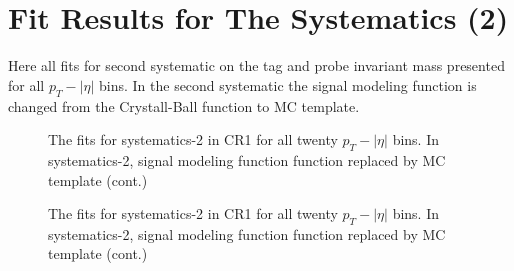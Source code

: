 
\chapter{Fit Results for The Systematics (2)} %

\label{AppendixC} %

Here all fits for second systematic on the tag and probe invariant mass presented for all $p_T-|\eta|$ bins. In the second systematic the signal modeling function is changed from the Crystall-Ball function to MC template.

\begin{figure}[H]
\begin{center}
\scalebox{0.35}{}\scalebox{0.35}{}
\scalebox{0.35}{}\scalebox{0.35}{}
\caption{The fits for systematics-2 in CR1 for all twenty $p_T-|\eta|$ bins. In systematics-2, signal modeling function function replaced by MC template (cont.)}
\label{fig:fit_cr1_sys2}
\end{center}
\end{figure}

\begin{figure}[H]
\begin{center}
\scalebox{0.35}{}\scalebox{0.35}{}
\scalebox{0.35}{}\scalebox{0.35}{}
\scalebox{0.35}{}\scalebox{0.35}{}
\scalebox{0.35}{}\scalebox{0.35}{}
\caption{The fits for systematics-2 in CR1 for all twenty $p_T-|\eta|$ bins. In systematics-2, signal modeling function function replaced by MC template (cont.)}
\label{fig:fit_cr1_sys2}
\end{center}
\end{figure}

